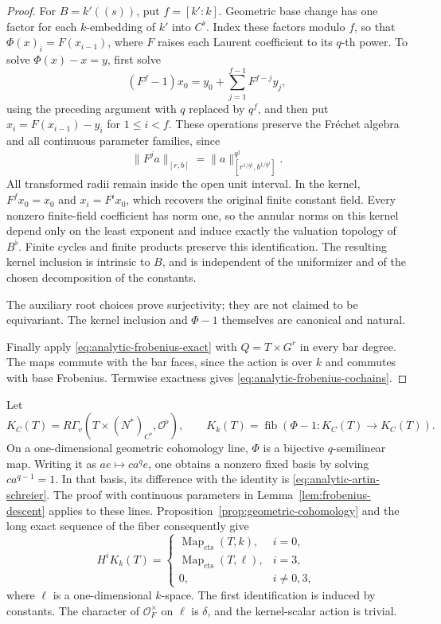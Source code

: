 \begin{proof}
For \(B=k'((s))\), put \(f=[k':k]\).  Geometric base change
has one factor for each \(k\)-embedding of \(k'\) into
\(C^\flat\).  Index these factors modulo \(f\), so that
\(\Phi(x)_i=F(x_{i-1})\), where \(F\) raises each Laurent
coefficient to its \(q\)-th power.  To solve
\(\Phi(x)-x=y\), first solve
\[
 (F^f-1)x_0
   =y_0+\sum_{j=1}^{f-1}F^{f-j}y_j,
\]
using the preceding argument with \(q\) replaced by \(q^f\),
and then put \(x_i=F(x_{i-1})-y_i\) for
\(1\leq i<f\).  These operations preserve the Fr\'echet
algebra and all continuous parameter families, since
\[
 \|F^j a\|_{[r,b]}
   =\|a\|_{[r^{1/q^j},b^{1/q^j}]}^{q^j}.
\]
All transformed radii remain inside the open unit interval.
In the kernel, \(F^f x_0=x_0\) and \(x_i=F^i x_0\),
which recovers the original finite constant field.
Every nonzero finite-field coefficient has norm one, so the
annular norms on this kernel depend only on the least exponent
and induce exactly the valuation topology of \(B^\flat\).
Finite cycles and finite products preserve this identification.
The resulting kernel inclusion is intrinsic to \(B\), and
is independent of the uniformizer and of the chosen decomposition
of the constants.

The auxiliary root choices prove surjectivity; they are not
claimed to be equivariant.  The kernel inclusion and
\(\Phi-1\) themselves are canonical and natural.

Finally apply \eqref{eq:analytic-frobenius-exact} with
\(Q=T\times G^r\) in every bar degree.
The maps commute with the bar faces, since the action is over
\(k\) and commutes with base Frobenius.
Termwise exactness gives \eqref{eq:analytic-frobenius-cochains}.
\end{proof}

Let
\begin{equation}
 K_C(T)=R\Gamma_v(T\times(N^\ast)_{C^\flat},\mathcal O^\flat),
 \qquad
 K_k(T)=\operatorname{fib}(\Phi-1:K_C(T)\to K_C(T)).
 \label{eq:analytic-arithmetic-complex}
\end{equation}
On a one-dimensional geometric cohomology line, \(\Phi\) is a
bijective \(q\)-semilinear map.  Writing it as
\(ae\mapsto c a^q e\), one obtains a nonzero fixed basis by solving
\(c a^{q-1}=1\).  In that basis, its difference with the identity is
\eqref{eq:analytic-artin-schreier}.
The proof with continuous parameters in
Lemma~\ref{lem:frobenius-descent} applies to these lines.
Proposition~\ref{prop:geometric-cohomology} and the long exact
sequence of the fiber consequently give
\begin{equation}
 H^i K_k(T)=
 \begin{cases}
 \operatorname{Map}_{\mathrm{cts}}(T,k),&i=0,\\
 \operatorname{Map}_{\mathrm{cts}}(T,\ell),&i=3,\\
 0,&i\neq0,3,
 \end{cases}
 \label{eq:analytic-arithmetic-rows}
\end{equation}
where \(\ell\) is a one-dimensional \(k\)-space.
The first identification is induced by constants.
The character of \(\mathcal O_F^\times\) on \(\ell\) is \(\delta\),
and the kernel-scalar action is trivial.

